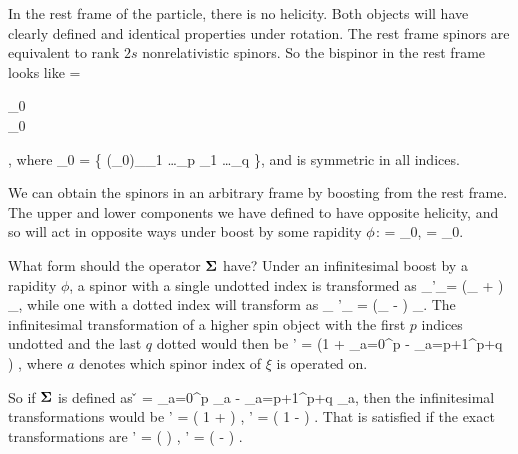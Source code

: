 In the rest frame of the particle, there is no helicity.  Both objects will have clearly defined and identical properties under rotation.    The rest frame spinors are equivalent to rank $2s$ nonrelativistic spinors.  So the bispinor in the rest frame looks like
\beq \label{eq:PsiRest}
	\Psig =  \begin{pmatrix} \xi_0 \\ \xi_0 \end{pmatrix},
\eeq
where
\beq \label{eq:xi0def}
	\xi_0 = \{ (\xi_0)_{\alpha_1 \ldots \alpha_p \beta_1 \ldots \beta_q}  \},
\eeq
and is symmetric in all indices.

We can obtain the spinors in an arbitrary frame by boosting from the rest frame.  The upper and lower components we have defined to have opposite helicity, and so will act in opposite ways under boost by some rapidity $\phi$:
\beq \label{eq:xi0boosted}
	\xi =  \xi_0,  
	\hspace{3em} 
	\eta =  \xi_0.
\eeq

What form should the operator $\mathbf{\Sigma}$ have?  Under an infinitesimal boost by a rapidity $\phi$, a spinor with a single undotted index is transformed as
\beqB
	\xi_\alpha \to \xi'_\alpha = \left(\delta_{\alpha \beta} +  \right) \xi_\beta, 
\eeqB
while one with a dotted index will transform as
\beqB
\xi_{\dot\alpha} \to \xi'_{\dot\alpha} = \left(\delta_{\dot \alpha \dot \beta} -  \right) \xi_{\dot \beta}.
\eeqB
The infinitesimal transformation of a higher spin object with the first $p$ indices undotted and the last $q$ dotted would then be
\beqB
	\xi \to \xi' = \left(1 
		+  \sum\limits_{a=0}^p 
		- \sum\limits_{a=p+1}^{p+q} 
	\right ) \xi,
\eeqB
where $a$ denotes which spinor index of $\xi$ is operated on.


So if $\mbox{\boldmath$ \Sigma $}$ is defined as
\beq \label{eq:SigDef}
	\v{\Sigma} = \sum\limits_{a=0}^p \gv{\sigma}_a - \sum\limits_{a=p+1}^{p+q} \gv{\sigma}_a,
\eeq
then the infinitesimal transformations would be
\beqB
	\xi \to \xi' = \left( 1 +  \right) \xi,
\eeqB
\beqB
	\eta \to \eta' = \left( 1 -  \right) \eta.
\eeqB
That is satisfied if the exact transformations are
\beqB
		\xi \to \xi' = \exp\left(  \right) \xi,
\eeqB
\beqB
	\eta \to \eta' = \exp \left( - \right) \eta.
\eeqB
  
